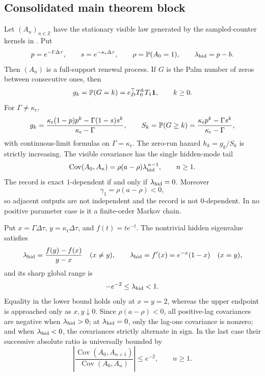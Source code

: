 \subsection{Consolidated main theorem block}\label{subsec:main-theorem-boundary}

\begin{paperthm}\label{thm:main-record-wrapper}
Let \((A_n)_{n\in\mathbb Z}\) have the stationary visible law generated by the
sampled-counter kernels in .  Put
\[
p=e^{-\Gamma\Delta\tau},\qquad
s=e^{-\kappa_{\mathrm r}\Delta\tau},\qquad
\rho=\mathbb{P}(A_0=1),\qquad
\lambda_{\rm hid}=p-b .
\]
Then \((A_n)\) is a full-support renewal process.  If \(G\) is the Palm number
of zeros between consecutive ones, then
\[
g_k=\mathbb{P}(G=k)=e_D^\top T_0^kT_1{\bf 1},\qquad k\ge0 .
\]
For \(\Gamma\ne\kappa_{\mathrm r}\),
\[
g_k=\frac{\kappa_{\mathrm r}(1-p)p^k-\Gamma(1-s)s^k}
          {\kappa_{\mathrm r}-\Gamma},
\qquad
S_k=\mathbb{P}(G\ge k)=
\frac{\kappa_{\mathrm r}p^k-\Gamma s^k}{\kappa_{\mathrm r}-\Gamma},
\]
with continuous-limit formulas on \(\Gamma=\kappa_{\mathrm r}\).  The zero-run
hazard \(h_k=g_k/S_k\) is strictly increasing.  The visible covariance has the
single hidden-mode tail
\[
\operatorname{Cov}(A_0,A_n)=\rho(a-\rho)\lambda_{\rm hid}^{\,n-1},
\qquad n\ge1 .
\]
  The record is exact \(1\)-dependent if and only if
  \(\lambda_{\rm hid}=0\).  Moreover
  \[
  \gamma_1=\rho(a-\rho)<0,
  \]
  so adjacent outputs are not independent and the record is not
  \(0\)-dependent.  In no positive parameter case is it a finite-order Markov
  chain.
\end{paperthm}

\begin{corollary}
\label{cor:sharp-hidden-mode-phase-main}
Put \(x=\Gamma\Delta\tau\), \(y=\kappa_{\mathrm r}\Delta\tau\), and
\(f(t)=te^{-t}\).  The nontrivial hidden eigenvalue satisfies
\[
\lambda_{\rm hid}=\frac{f(y)-f(x)}{y-x}\quad(x\ne y),\qquad
\lambda_{\rm hid}=f'(x)=e^{-x}(1-x)\quad(x=y),
\]
and its sharp global range is
\[
-e^{-2}\le\lambda_{\rm hid}<1.
\]
Equality in the lower bound holds only at \(x=y=2\), whereas the upper
endpoint is approached only as \(x,y\downarrow0\).  Since
\(\rho(a-\rho)<0\), all positive-lag covariances are negative when
\(\lambda_{\rm hid}>0\); at \(\lambda_{\rm hid}=0\), only the lag-one
covariance is nonzero; and when \(\lambda_{\rm hid}<0\), the covariances
strictly alternate in sign.  In the last case their successive absolute
ratio is universally bounded by
\[
\left|\frac{\operatorname{Cov}(A_0,A_{n+1})}
{\operatorname{Cov}(A_0,A_n)}\right|\le e^{-2},\qquad n\ge1.
\]
\end{corollary}

